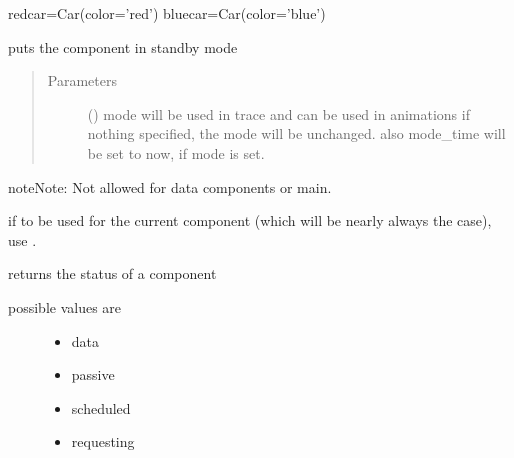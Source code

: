 \documentclass[letterpaper,10pt,english]{sphinxmanual}
\begin{document}
\begin{fulllineitems}
\begin{fulllineitems}
\begin{description}
\end{description}

redcar=Car(color=’red’) 
bluecar=Car(color=’blue’)

\end{fulllineitems}


\begin{fulllineitems}
\label{\detokenize{Reference:salabim.Component.standby}}
puts the component in standby mode
\begin{quote}\begin{description}
\item[{Parameters}] \leavevmode
{} () \textendash{} mode 
will be used in trace and can be used in animations 
if nothing specified, the mode will be unchanged. 
also mode\_time will be set to now, if mode is set.

\end{description}\end{quote}

\begin{sphinxadmonition}{note}{Note:}
Not allowed for data components or main.

if to be used for the current component
(which will be nearly always the case),
use .
\end{sphinxadmonition}

\end{fulllineitems}


\begin{fulllineitems}
\label{\detokenize{Reference:salabim.Component.status}}
returns the status of a component
\begin{description}
\item[{possible values are}] \leavevmode\begin{itemize}
\item {} 
data

\item {} 
passive

\item {} 
scheduled

\item {} 
requesting


\end{itemize}
\end{description}
\end{fulllineitems}
\end{fulllineitems}
\end{document}
